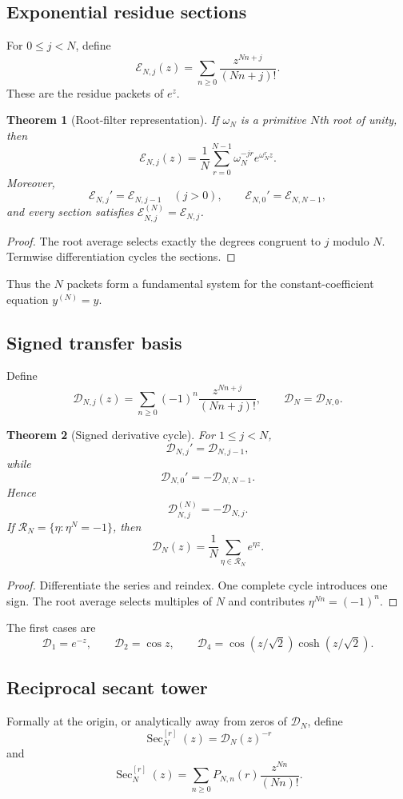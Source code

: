 \documentclass[11pt]{article}
\newtheorem{theorem}{Theorem}[section]\newtheorem{proposition}[theorem]{Proposition}\newtheorem{lemma}[theorem]{Lemma}\newtheorem{corollary}[theorem]{Corollary}
\theoremstyle{definition}\newtheorem{definition}[theorem]{Definition}\newtheorem{example}[theorem]{Example}\newtheorem{construction}[theorem]{Construction}\newtheorem{algorithm}[theorem]{Algorithm}\newtheorem{conjecture}[theorem]{Conjecture}\newtheorem{problem}[theorem]{Problem}
\theoremstyle{remark}\newtheorem{remark}[theorem]{Remark}\newtheorem{boundary}[theorem]{Boundary}\newtheorem{certificate}[theorem]{Computational Certificate}\newtheorem{classical}[theorem]{Classical Input}\newtheorem{principle}[theorem]{Structural Principle}
\begin{document}
\subsection{Exponential residue sections}
For $0\leq j<N$, define
\[
 \boxed{\mathcal E_{N,j}(z)=\sum_{n\geq0}\frac{z^{Nn+j}}{(Nn+j)!}.}
\]
These are the residue packets of $e^z$.

\begin{theorem}[Root-filter representation]
If $\omega_N$ is a primitive $N$th root of unity, then
\[
 \boxed{\mathcal E_{N,j}(z)=\frac1N\sum_{r=0}^{N-1}\omega_N^{-jr}e^{\omega_N^rz}.}
\]
Moreover,
\[
 \mathcal E_{N,j}'=\mathcal E_{N,j-1}\quad(j>0),
 \qquad
 \mathcal E_{N,0}'=\mathcal E_{N,N-1},
\]
and every section satisfies $\mathcal E_{N,j}^{(N)}=\mathcal E_{N,j}$.
\end{theorem}
\begin{proof}
The root average selects exactly the degrees congruent to $j$ modulo $N$.  Termwise differentiation cycles the sections.
\end{proof}

Thus the $N$ packets form a fundamental system for the constant-coefficient equation $y^{(N)}=y$.

\subsection{Signed transfer basis}
Define
\[
 \boxed{\mathcal D_{N,j}(z)=\sum_{n\geq0}(-1)^n\frac{z^{Nn+j}}{(Nn+j)!},}
 \qquad
 \mathcal D_N=\mathcal D_{N,0}.
\]

\begin{theorem}[Signed derivative cycle]
For $1\leq j<N$,
\[
 \mathcal D_{N,j}'=\mathcal D_{N,j-1},
\]
while
\[
 \mathcal D_{N,0}'=-\mathcal D_{N,N-1}.
\]
Hence
\[
 \boxed{\mathcal D_{N,j}^{(N)}=-\mathcal D_{N,j}.}
\]
If $\mathcal R_N=\{\eta:\eta^N=-1\}$, then
\[
 \boxed{\mathcal D_N(z)=\frac1N\sum_{\eta\in\mathcal R_N}e^{\eta z}.}
\]
\end{theorem}
\begin{proof}
Differentiate the series and reindex.  One complete cycle introduces one sign.  The root average selects multiples of $N$ and contributes $\eta^{Nn}=(-1)^n$.
\end{proof}

The first cases are
\[
 \mathcal D_1=e^{-z},\qquad
 \mathcal D_2=\cos z,\qquad
 \mathcal D_4=\cos(z/\sqrt2)\cosh(z/\sqrt2).
\]

\subsection{Reciprocal secant tower}
Formally at the origin, or analytically away from zeros of $\mathcal D_N$, define
\[
 \boxed{\operatorname{Sec}_N^{[r]}(z)=\mathcal D_N(z)^{-r}}
\]
and
\[
 \operatorname{Sec}_N^{[r]}(z)=\sum_{n\geq0}P_{N,n}(r)\frac{z^{Nn}}{(Nn)!}.
\]
\end{document}
